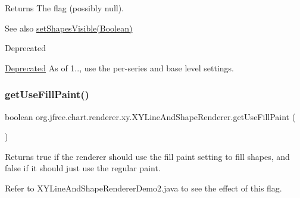 \begin{DoxyReturn}{Returns}
The flag (possibly {\ttfamily null}).
\end{DoxyReturn}
\begin{DoxySeeAlso}{See also}
\mbox{\hyperlink{classorg_1_1jfree_1_1chart_1_1renderer_1_1xy_1_1_x_y_line_and_shape_renderer_a1e887ed2b1e631fa9da701341b764c43}{set\+Shapes\+Visible(\+Boolean)}}
\end{DoxySeeAlso}
\begin{DoxyRefDesc}{Deprecated}
\item[\mbox{\hyperlink{deprecated__deprecated000245}{Deprecated}}]As of 1.., use the per-\/series and base level settings. \end{DoxyRefDesc}
\mbox{\label{classorg_1_1jfree_1_1chart_1_1renderer_1_1xy_1_1_x_y_line_and_shape_renderer_a8bd7907c3f07dbe4495fd3f0d7a7e4d4}} 
\subsubsection{\texorpdfstring{get\+Use\+Fill\+Paint()}{getUseFillPaint()}}
{\footnotesize\ttfamily boolean org.\+jfree.\+chart.\+renderer.\+xy.\+X\+Y\+Line\+And\+Shape\+Renderer.\+get\+Use\+Fill\+Paint (\begin{DoxyParamCaption}{ }\end{DoxyParamCaption})}

Returns {\ttfamily true} if the renderer should use the fill paint setting to fill shapes, and {\ttfamily false} if it should just use the regular paint. 

Refer to {\ttfamily X\+Y\+Line\+And\+Shape\+Renderer\+Demo2.\+java} to see the effect of this flag.

